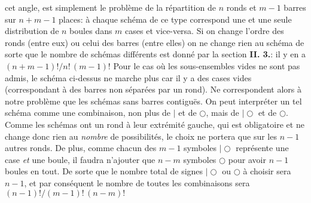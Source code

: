 cet angle, est simplement le probl\`eme de la r\'epartition de $n$ ronds 
et $m-1$ barres sur $n + m -1$ places: \`a chaque sch\'ema de ce type 
correspond une et une seule distribution de $n$ boules dans $m$ cases et 
vice-versa. Si on change l'ordre des ronds (entre eux) ou celui des barres 
(entre elles) on ne change rien au sch\'ema de sorte que le nombre de 
sch\'emas diff\'erents est donn\'e par la section {\bf II. 3.}: il y en a 
$(n+m-1)! / n!\, (m-1)!$  
\medskip 
Pour le cas o\`u les sous-ensembles vides ne sont pas admis, le sch\'ema 
ci-dessus ne marche plus car il y a des cases vides (correspondant \`a  
des barres non s\'epar\'ees par un rond). Ne correspondent alors \`a notre 
probl\`eme que les sch\'emas sans barres contigu\"es. On peut 
interpr\'eter un tel sch\'ema comme une combinaison, non plus de $\mid$  
et de $\bigcirc$, mais de $\mid\bigcirc$ et de $\bigcirc$. Comme les 
sch\'emas ont un rond \`a leur extr\'emit\'e gauche, qui est obligatoire  
et  ne change donc rien au {\it nombre} de possibilit\'es, le choix ne 
portera que sur les $n-1$ autres ronds. De plus, comme chacun des $m-1$ 
symboles  $\mid \bigcirc$ repr\'esente une case {\it et} une boule, il 
faudra n'ajouter que $n-m$ symboles $\bigcirc$ pour  avoir $n-1$ boules 
en tout. De sorte  que le nombre total de signes $\mid\bigcirc$ ou 
$\bigcirc$ \`a choisir  sera $n-1$, et par cons\'equent le nombre de 
toutes les combinaisons sera $(n-1)! / (m-1)!\, (n-m)!$     
\medskip 
 
